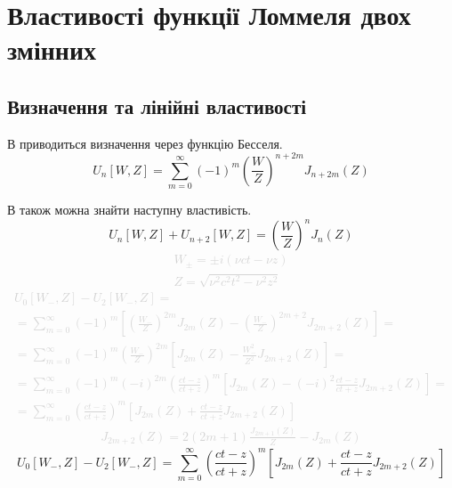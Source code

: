 \chapter{Властивості функції Ломмеля двох змінних}
\label{ch:lommel}

\section{Визначення та лінійні властивості}

В \cite{Boersma1961} приводиться визначення через функцію Бесселя.
%
\begin{equation}
U_n \left[ W, Z \right] = \sum \limits_{m = 0}^{\infty} (-1)^m
\left( \frac{W}{Z} \right)^{n + 2m} J_{n + 2m} (Z)
\end{equation}

В \cite{Boersma1961} також можна знайти наступну властивість.
%
\begin{equation}
U_n \left[ W, Z \right] + U_{n+2} \left[ W, Z \right] = 
\left( \frac{W}{Z} \right)^n J_n (Z)
\end{equation}
%
\textcolor{lightgray} { \begin{equation*} \begin{aligned}
W_\pm = \pm i (\nu ct - \nu z) \\
Z = \sqrt{\nu^2 c^2t^2 - \nu^2 z^2}
\end{aligned} \end{equation*} }
%
\textcolor{lightgray}{ \begin{equation*} \begin{aligned}
U_0[W_-, Z] - U_2[W_-, Z] = \\ = \sum \limits_{m = 0}^{\infty} (-1)^m
\left[ \left( \frac{W_-}{Z} \right)^{2m} J_{2m} (Z) -
\left( \frac{W_-}{Z} \right)^{2m+2} J_{2m+2} (Z) \right] = \\
= \sum \limits_{m = 0}^{\infty} (-1)^m \left( \frac{W_-}{Z} \right)^{2m}
\left[ J_{2m} (Z) - \frac{W_-^2}{Z^2} J_{2m+2} (Z) \right] = \\
= \sum \limits_{m = 0}^{\infty} (-1)^m (-i)^{2m} 
\left( \frac{ct-z}{ct+z} \right)^m
\left[ J_{2m}(Z) - (-i)^2 \frac{ct-z}{ct+z} J_{2m+2}(Z) \right] = \\
= \sum \limits_{m = 0}^{\infty} \left( \frac{ct-z}{ct+z} \right)^m
\left[ J_{2m}(Z) + \frac{ct-z}{ct+z} J_{2m+2}(Z) \right]
\end{aligned} \end{equation*} }
%
\textcolor{lightgray}{ \begin{equation*} \begin{aligned}
J_{2m+2}(Z) = 2 (2m+1) \frac{J_{2m+1}(Z)}{Z} - J_{2m}(Z)
\end{aligned} \end{equation*} }
%
\begin{equation} 
U_0[W_-, Z] - U_2[W_-, Z] = 
\sum \limits_{m = 0}^{\infty} \left( \frac{ct-z}{ct+z} \right)^m
\left[ J_{2m}(Z) + \frac{ct-z}{ct+z} J_{2m+2}(Z) \right]
\end{equation}

